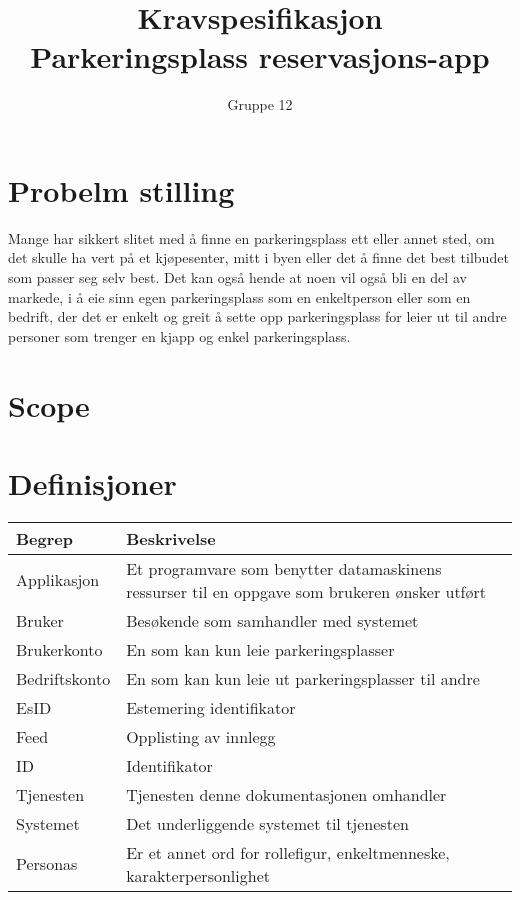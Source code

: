 \documentclass[12pt]{article}
\begin{document}
\title{%
    Kravspesifikasjon\\
    \large Parkeringsplass reservasjons-app }
\author{Gruppe 12}
\date{}
\maketitle

\newpage

\tableofcontents

\newpage

\section{Probelm stilling}
Mange har sikkert slitet med å finne en parkeringsplass ett eller annet sted, om det skulle ha vert på et kjøpesenter, mitt i byen eller det å finne det best tilbudet som passer seg selv best. Det kan også hende at noen vil også bli en del av markede, i å eie sinn egen parkeringsplass som en enkeltperson eller som en bedrift, der det er enkelt og greit å sette opp parkeringsplass for leier ut til andre personer som trenger en kjapp og enkel parkeringsplass. 

\section{Scope}

\section{Definisjoner}

\begin{center}
    \begin{tabular}{|p{4cm}|p{12cm}| } 
        \hline
        \bf Begrep & \bf Beskrivelse \\
        \hline
        Applikasjon &  Et programvare som benytter datamaskinens ressurser til en oppgave som brukeren ønsker utført \\
        \hline
        Bruker & Besøkende som samhandler med systemet \\
        \hline
        Brukerkonto & En som kan kun leie parkeringsplasser \\
        \hline
        Bedriftskonto & En som kan kun leie ut parkeringsplasser til andre \\
        \hline
        EsID & Estemering identifikator \\
        \hline
        Feed & Opplisting av innlegg \\
        \hline
        ID & Identifikator \\
        \hline
        Tjenesten & Tjenesten denne dokumentasjonen omhandler \\
        \hline
        Systemet & Det underliggende systemet til tjenesten \\
        \hline
        Personas & Er et annet ord for rollefigur, enkeltmenneske, karakterpersonlighet\\
        \hline
    \end{tabular}
\end{center}
\end{document}
